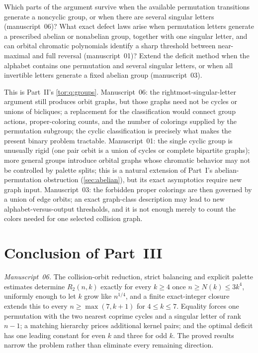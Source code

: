 \documentclass[11pt,a4paper]{article}
\numberwithin{equation}{section}
\theoremstyle{definition}
\theoremstyle{remark}
\begin{document}
\begin{question}\label{evo:q:groups}
Which parts of the argument survive when the available permutation
transitions generate a noncyclic group, or when there are several singular
letters (manuscript~06)? What exact defect laws arise when permutation letters
generate a prescribed abelian or nonabelian group, together with one singular
letter, and can orbital chromatic polynomials identify a sharp threshold
between near-maximal and full reversal (manuscript~01)? Extend the deficit
method when the alphabet contains one permutation and several singular
letters, or when all invertible letters generate a fixed abelian group
(manuscript~03).
\end{question}
This is Part~II's \cref{tor:q:groups}. Manuscript~06: the
rightmost-singular-letter argument still produces orbit graphs, but those
graphs need not be cycles or unions of bicliques; a replacement for the
classification would connect group actions, proper-coloring counts, and the
number of colorings supplied by the permutation subgroup; the cyclic
classification is precisely what makes the present binary problem tractable.
Manuscript~01: the single cyclic group is unusually rigid (one pair orbit is a
union of cycles or complete bipartite graphs); more general groups introduce
orbital graphs whose chromatic behavior may not be controlled by palette
splits; this is a natural extension of Part~I's abelian-permutation
obstruction (\cref{sec:abelian}), but its exact asymptotics require new graph
input. Manuscript~03: the forbidden proper colorings are then governed by a
union of edge orbits; an exact graph-class description may lead to new
alphabet-versus-output thresholds, and it is not enough merely to count the
colors needed for one selected collision graph.

\section{Conclusion of Part~III}\label{evo:sec:conclusion}

\emph{Manuscript~06.} The collision-orbit reduction, strict balancing and
explicit palette estimates determine $R_2(n,k)$ exactly for every $k\ge4$ once
$n\ge N(k)\le3k^4$, uniformly enough to let $k$ grow like $n^{1/4}$, and a
finite exact-integer closure extends this to every $n\ge\max(7,k+1)$ for
$4\le k\le7$. Equality forces one permutation with the two nearest coprime
cycles and a singular letter of rank $n-1$; a matching hierarchy prices
additional kernel pairs; and the optimal deficit has one leading constant
for even $k$ and three for odd $k$. The proved results narrow the problem
rather than eliminate every remaining direction.
\end{document}
